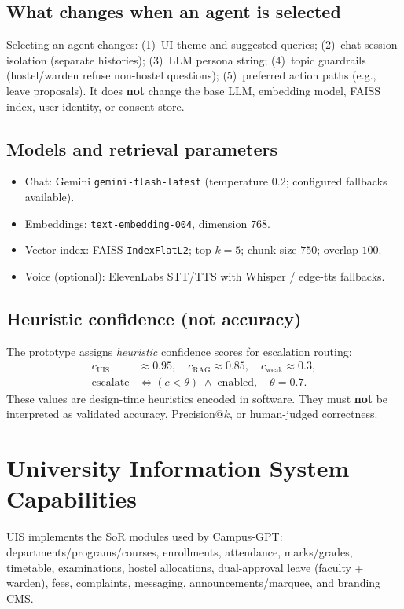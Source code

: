 \documentclass[conference]{IEEEtran}
\begin{document}
\subsection{What changes when an agent is selected}
Selecting an agent changes: (1)~UI theme and suggested queries; (2)~chat session isolation (separate histories); (3)~LLM persona string; (4)~topic guardrails (hostel/warden refuse non-hostel questions); (5)~preferred action paths (e.g., leave proposals). It does \textbf{not} change the base LLM, embedding model, FAISS index, user identity, or consent store.

\subsection{Models and retrieval parameters}
\begin{itemize}[leftmargin=*,itemsep=1pt]
  \item Chat: Gemini \texttt{gemini-flash-latest} (temperature $0.2$; configured fallbacks available).
  \item Embeddings: \texttt{text-embedding-004}, dimension $768$.
  \item Vector index: FAISS \texttt{IndexFlatL2}; top-$k{=}5$; chunk size $750$; overlap $100$.
  \item Voice (optional): ElevenLabs STT/TTS with Whisper / edge-tts fallbacks.
\end{itemize}

\subsection{Heuristic confidence (not accuracy)}
The prototype assigns \emph{heuristic} confidence scores for escalation routing:
\begin{align}
c_{\text{UIS}} &\approx 0.95, \quad
c_{\text{RAG}} \approx 0.85, \quad
c_{\text{weak}} \approx 0.3, \\
\text{escalate} &\iff (c < \theta)\;\wedge\;\text{enabled},\quad \theta = 0.7.
\end{align}
These values are design-time heuristics encoded in software. They must \textbf{not} be interpreted as validated accuracy, Precision@$k$, or human-judged correctness.

\section{University Information System Capabilities}
UIS implements the SoR modules used by Campus-GPT: departments/programs/courses, enrollments, attendance, marks/grades, timetable, examinations, hostel allocations, dual-approval leave (faculty + warden), fees, complaints, messaging, announcements/marquee, and branding CMS.
\end{document}
